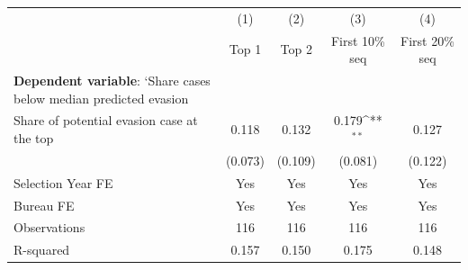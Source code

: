 {
\def\sym#1{\ifmmode^{#1}\else\(^{#1}\)\fi}
\begin{tabular}{l*{4}{c}}
\toprule
            &\multicolumn{1}{c}{(1)}&\multicolumn{1}{c}{(2)}&\multicolumn{1}{c}{(3)}&\multicolumn{1}{c}{(4)}\\
            &\multicolumn{1}{c}{Top 1}&\multicolumn{1}{c}{Top 2}&\multicolumn{1}{c}{First 10\% seq}&\multicolumn{1}{c}{First 20\% seq}\\
\midrule
\textbf{Dependent variable}: `Share cases below median predicted evasion&                     &                     &                     &                     \\
\addlinespace
Share of potential evasion case at the top&       0.118         &       0.132         &       0.179\sym{**} &       0.127         \\
            &     (0.073)         &     (0.109)         &     (0.081)         &     (0.122)         \\
\midrule
Selection Year FE&         Yes         &         Yes         &         Yes         &         Yes         \\
Bureau FE   &         Yes         &         Yes         &         Yes         &         Yes         \\
Observations&         116         &         116         &         116         &         116         \\
R-squared   &       0.157         &       0.150         &       0.175         &       0.148         \\
\bottomrule
\end{tabular}
}
